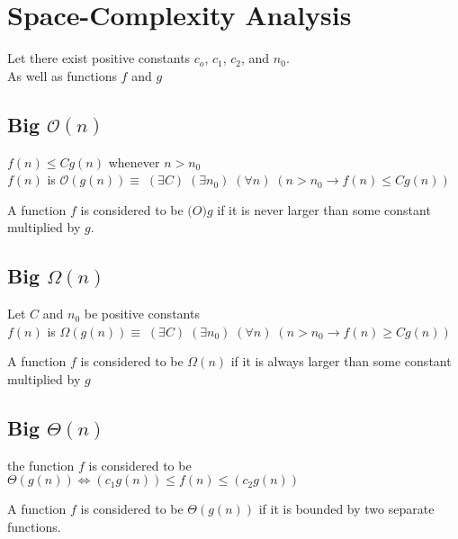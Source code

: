 \documentclass[a4paper]{article}
\newenvironment{definition}[1][Formal Definition]{\begin{trivlist}\item[\hskip \labelsep {\bfseries #1}]}{\end{trivlist}}
\newenvironment{indef}[1][Informal Definition]{\begin{trivlist}\item[\hskip \labelsep {\bfseries #1}]}{\end{trivlist}}
\begin{document}
\section{Space-Complexity Analysis}
Let there exist positive constants $c_o$, $c_1$, $c_2$, and  $n_0$.\\ As well as functions $f$ and $g$
\subsection{Big $\mathcal{O}(n)$} 
\begin{definition} 
\leavevmode
$f(n) \leq Cg(n)$ whenever $n>n_0$\\
$f(n)$ is $ \mathcal{O}(g(n)) \equiv \; (\exists C) \; (\exists n_0) \; (\forall n) \;(n > n_0 \rightarrow f(n) \leq Cg(n))$
\cite{Auckland}
\end{definition}
\begin{indef}
A function $f$ is considered to be $\mathcal(O){g}$ if it is never larger than some constant multiplied by $g$.
\end{indef}

\subsection{Big $\Omega(n)$}
\begin{definition}Let $C$ and $n_0$ be positive constants  \\
$f(n)$ is $ \Omega(g(n)) \equiv \; (\exists C) \; (\exists n_0) \; (\forall n) \;(n > n_0 \rightarrow f(n) \geq Cg(n))$
\cite{Auckland}
\end{definition}
\begin{indef}
A function $f$ is considered to be $\Omega(n)$ if it is always larger than some constant multiplied by $g$	
\end{indef}

\subsection{Big $\Theta(n)$}
\begin{definition}
the function $f$ is considered to be $\Theta(g(n)) \iff (c_1g(n)) \leq f(n) \leq (c_2g(n))$
\cite{Auckland} 
\end{definition}
\begin{indef}
A function $f$ is considered to be $\Theta(g(n))$ if it is bounded by two separate functions.	
\end{indef}
\end{document}
